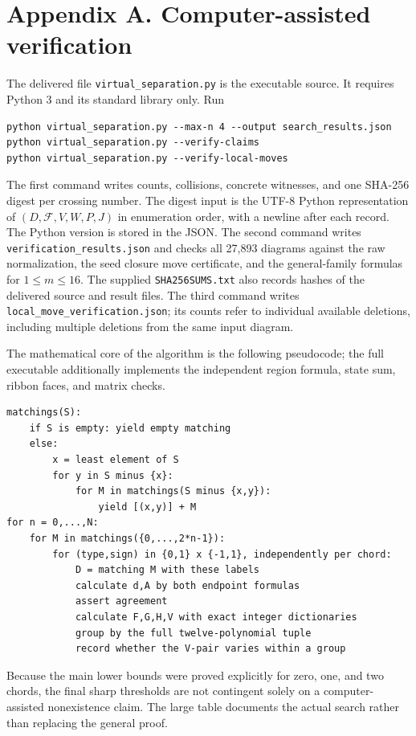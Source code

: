 \documentclass[12pt]{amsart}
\theoremstyle{definition}
\theoremstyle{remark}
\numberwithin{equation}{section}
\newcommand{\Package}{\mathcal F}
\begin{document}
\section*{Appendix A. Computer-assisted verification}
\begingroup\small
The delivered file \texttt{virtual\_separation.py} is the executable source.
It requires Python 3 and its standard library only. Run
\begin{lstlisting}
python virtual_separation.py --max-n 4 --output search_results.json
python virtual_separation.py --verify-claims
python virtual_separation.py --verify-local-moves
\end{lstlisting}
The first command writes counts, collisions, concrete witnesses, and one
SHA-256 digest per crossing number. The digest input is the UTF-8 Python
representation of $(D,\Package,V,W,P,J)$ in enumeration order, with a
newline after each record. The Python version is stored in the JSON.
The second command writes \texttt{verification\_results.json} and checks
all 27,893 diagrams against the raw normalization, the seed closure move
certificate, and the general-family formulas for $1\le m\le16$.
The supplied \texttt{SHA256SUMS.txt} also records hashes of the delivered
source and result files.
The third command writes \texttt{local\_move\_verification.json}; its
counts refer to individual available deletions, including multiple
deletions from the same input diagram.

The mathematical core of the algorithm is the following pseudocode; the
full executable additionally implements the independent region formula,
state sum, ribbon faces, and matrix checks.
\par\noindent\begin{minipage}{\linewidth}
\begin{lstlisting}
matchings(S):
    if S is empty: yield empty matching
    else:
        x = least element of S
        for y in S minus {x}:
            for M in matchings(S minus {x,y}):
                yield [(x,y)] + M
for n = 0,...,N:
    for M in matchings({0,...,2*n-1}):
        for (type,sign) in {0,1} x {-1,1}, independently per chord:
            D = matching M with these labels
            calculate d,A by both endpoint formulas
            assert agreement
            calculate F,G,H,V with exact integer dictionaries
            group by the full twelve-polynomial tuple
            record whether the V-pair varies within a group
\end{lstlisting}
\end{minipage}\par
Because the main lower bounds were proved explicitly for zero, one, and
two chords, the final sharp thresholds are not contingent solely on a
computer-assisted nonexistence claim. The large table documents the
actual search rather than replacing the general proof.
\endgroup
\end{document}
